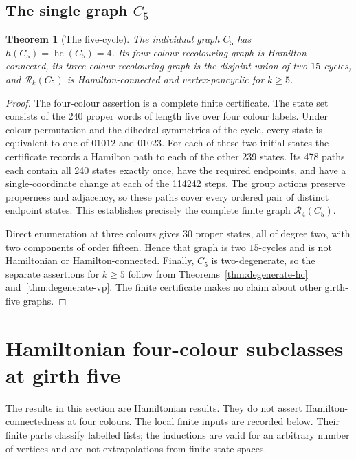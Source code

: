 \documentclass[11pt]{article}
\newtheorem{theorem}{Theorem}[section]
\theoremstyle{remark}
\newcommand{\R}{\mathcal R}
\newcommand{\Rk}{\mathcal R_k}
\newcommand{\hc}{\operatorname{hc}}
\numberwithin{equation}{section}
\begin{document}
\subsection{The single graph \texorpdfstring{$C_5$}{C5}}

\begin{theorem}[The five-cycle]
\label{thm:c5}
The individual graph $C_5$ has $h(C_5)=\hc(C_5)=4$.
Its four-colour recolouring graph is Hamilton-connected, its
three-colour recolouring graph is the disjoint union of two $15$-cycles,
and $\Rk(C_5)$ is Hamilton-connected and vertex-pancyclic for
$k\ge5$.
\end{theorem}

\begin{proof}
The four-colour assertion is a complete finite certificate.  The state
set consists of the 240 proper words of length five over four colour
labels.  Under colour permutation and the dihedral symmetries of the
cycle, every state is equivalent to one of $01012$ and $01023$.
For each of these two initial states the certificate records a Hamilton
path to each of the other 239 states.  Its 478 paths each contain all
240 states exactly once, have the required endpoints, and have a
single-coordinate change at each of the 114242 steps.  The group
actions preserve properness and adjacency, so these paths cover every
ordered pair of distinct endpoint states.  This establishes precisely
the complete finite graph $\R_4(C_5)$.

Direct enumeration at three colours gives 30 proper states, all of
degree two, with two components of order fifteen.  Hence that graph is
two $15$-cycles and is not Hamiltonian or Hamilton-connected.
Finally, $C_5$ is two-degenerate, so the separate assertions for
$k\ge5$ follow from Theorems~\ref{thm:degenerate-hc}
and~\ref{thm:degenerate-vp}.  The finite certificate makes no claim
about other girth-five graphs.
\end{proof}


\section{Hamiltonian four-colour subclasses at girth five}
\label{sec:four-colour-subclasses}

The results in this section are Hamiltonian results.  They do not assert
Hamilton-connectedness at four colours.  The local finite inputs are recorded below.  Their finite parts classify
labelled lists; the inductions are valid for an arbitrary number of
vertices and are not extrapolations from finite state spaces.
\end{document}
